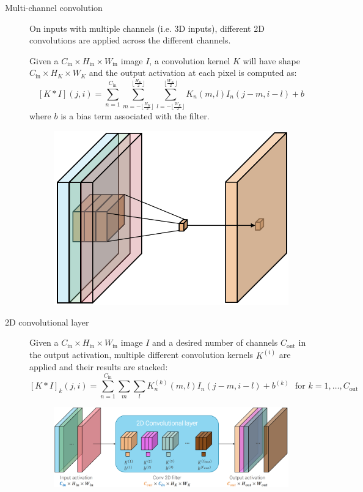 \begin{description}
    \item[Multi-channel convolution] 
        On inputs with multiple channels (i.e. 3D inputs), different 2D convolutions are applied across the different channels.

        Given a $C_\text{in} \times H_\text{in} \times W_\text{in}$ image $I$, a convolution kernel $K$ will have shape $C_\text{in} \times H_K \times W_K$
        and the output activation at each pixel is computed as:
        \[ 
            [K * I](j, i) = 
                \sum_{n=1}^{C_\text{in}} 
                \sum_{m = -\lfloor \frac{H_K}{2} \rfloor}^{\lfloor \frac{H_K}{2} \rfloor} 
                \sum_{l = -\lfloor \frac{W_K}{2} \rfloor}^{\lfloor \frac{W_K}{2} \rfloor} 
                    K_n(m, l) I_n(j-m, i-l) + b
        \]
        where $b$ is a bias term associated with the filter.

        \begin{figure}[H]
            \centering
            \includegraphics[width=0.2\linewidth]{./img/2d_convolution.png}
        \end{figure}

    \item[2D convolutional layer] 
        Given a $C_\text{in} \times H_\text{in} \times W_\text{in}$ image $I$ and a desired number of channels $C_\text{out}$ in the output activation,
        multiple different convolution kernels $K^{(i)}$ are applied and their results are stacked:
        \[
            [K * I]_k(j, i) = \sum_{n=1}^{C_\text{in}} \sum_{m} \sum_{l} K_n^{(k)}(m, l) I_n(j-m, i-l) + b^{(k)} \,\,\text{ for $k=1, \dots, C_\text{out}$} 
        \]

        \begin{figure}[H]
            \centering
            \includegraphics[width=0.65\linewidth]{./img/2d_convolution_multi_out.png}
        \end{figure}


\end{description}
